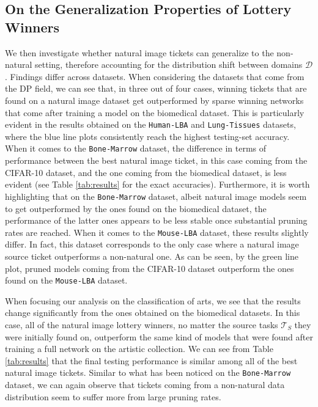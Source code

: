 




\subsection{On the Generalization Properties of Lottery Winners}
We then investigate whether natural image tickets can generalize to the non-natural setting, therefore accounting for the distribution shift between domains $\mathcal{D}$. Findings differ across datasets. When considering the datasets that come from the DP field, we can see that, in three out of four cases, winning tickets that are found on a natural image dataset get outperformed by sparse winning networks that come after training a model on the biomedical dataset. This is particularly evident in the results obtained on the \texttt{Human-LBA} and \texttt{Lung-Tissues} datasets, where the blue line plots consistently reach the highest testing-set accuracy. When it comes to the \texttt{Bone-Marrow} dataset, the difference in terms of performance between the best natural image ticket, in this case coming from the CIFAR-10 dataset, and the one coming from the biomedical dataset, is less evident (see Table \ref{tab:results} for the exact accuracies). Furthermore, it is worth highlighting that on the \texttt{Bone-Marrow} dataset, albeit natural image models seem to get outperformed by the ones found on the biomedical dataset, the performance of the latter ones appears to be less stable once substantial pruning rates are reached. When it comes to the \texttt{Mouse-LBA} dataset, these results slightly differ. In fact, this dataset corresponds to the only case where a natural image source ticket outperforms a non-natural one. As can be seen, by the green line plot, pruned models coming from the CIFAR-10 dataset outperform the ones found on the \texttt{Mouse-LBA} dataset. 

When focusing our analysis on the classification of arts, we see that the results change significantly from the ones obtained on the biomedical datasets. In this case, all of the natural image lottery winners, no matter the source tasks $\mathcal{T}_S$ they were initially found on, outperform the same kind of models that were found after training a full network on the artistic collection. We can see from Table \ref{tab:results} that the final testing performance is similar among all of the best natural image tickets. Similar to what has been noticed on the \texttt{Bone-Marrow} dataset, we can again observe that tickets coming from a non-natural data distribution seem to suffer more from large pruning rates. 

